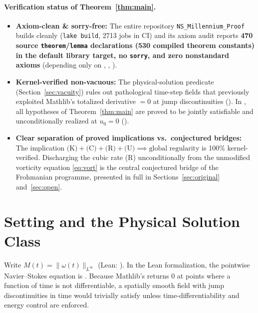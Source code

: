 \documentclass[11pt,a4paper]{article}
\theoremstyle{plain}
\theoremstyle{definition}
\theoremstyle{remark}
\begin{document}
\paragraph{Verification status of Theorem~\ref{thm:main}.}
\begin{itemize}
\item \textbf{Axiom-clean \& sorry-free:} The entire repository \texttt{NS\_Millennium\_Proof} builds cleanly (\texttt{lake build}, 2713 jobs in CI) and its axiom audit reports \textbf{470 source \texttt{theorem}/\texttt{lemma} declarations (530 compiled theorem constants) in the default library target, no \texttt{sorry}, and zero nonstandard axioms} (depending only on , , ).
\item \textbf{Kernel-verified non-vacuous:} The physical-solution predicate  (Section~\ref{sec:vacuity}) rules out pathological time-step fields that previously exploited Mathlib's totalized derivative  $=0$ at jump discontinuities (). In , all hypotheses of Theorem~\ref{thm:main} are proved to be jointly satisfiable and unconditionally realized at $u_0=0$ ().
\item \textbf{Clear separation of proved implications vs.\ conjectured bridges:} The implication $\text{(K)}+\text{(C)}+\text{(R)}+\text{(U)}\implies\text{global regularity}$ is 100\% kernel-verified. Discharging the cubic rate (R) unconditionally from the unmodified vorticity equation \eqref{eq:vort} is the central conjectured bridge of the Frohmanian programme, presented in full in Sections~\ref{sec:original} and~\ref{sec:open}.
\end{itemize}

\section{Setting and the Physical Solution Class}\label{sec:setting}

Write $M(t)=\|\omega(t)\|_{L^\infty}$ (Lean: ). In the Lean formalization, the pointwise Navier--Stokes equation is . Because Mathlib's  returns $0$ at points where a function of time is not differentiable, a spatially smooth field with jump discontinuities in time would trivially satisfy  unless time-differentiability and energy control are enforced.
\end{document}
